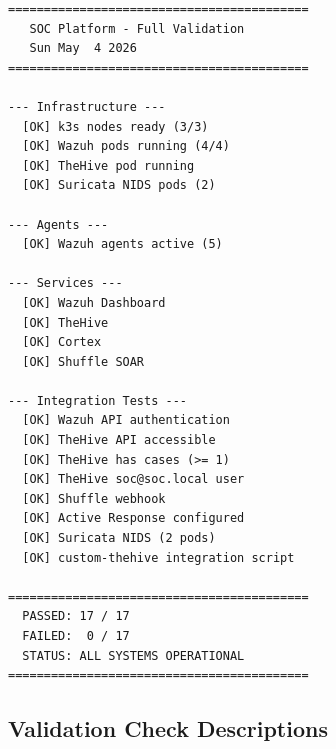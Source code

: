 \documentclass[12pt,a4paper]{report}
\begin{document}
\begin{lstlisting}[caption=validate.sh output -- 2026-05-04 (17/17)]
==========================================
   SOC Platform - Full Validation
   Sun May  4 2026
==========================================

--- Infrastructure ---
  [OK] k3s nodes ready (3/3)
  [OK] Wazuh pods running (4/4)
  [OK] TheHive pod running
  [OK] Suricata NIDS pods (2)

--- Agents ---
  [OK] Wazuh agents active (5)

--- Services ---
  [OK] Wazuh Dashboard
  [OK] TheHive
  [OK] Cortex
  [OK] Shuffle SOAR

--- Integration Tests ---
  [OK] Wazuh API authentication
  [OK] TheHive API accessible
  [OK] TheHive has cases (>= 1)
  [OK] TheHive soc@soc.local user
  [OK] Shuffle webhook
  [OK] Active Response configured
  [OK] Suricata NIDS (2 pods)
  [OK] custom-thehive integration script

==========================================
  PASSED: 17 / 17
  FAILED:  0 / 17
  STATUS: ALL SYSTEMS OPERATIONAL
==========================================
\end{lstlisting}

\subsection{Validation Check Descriptions}
\end{document}

